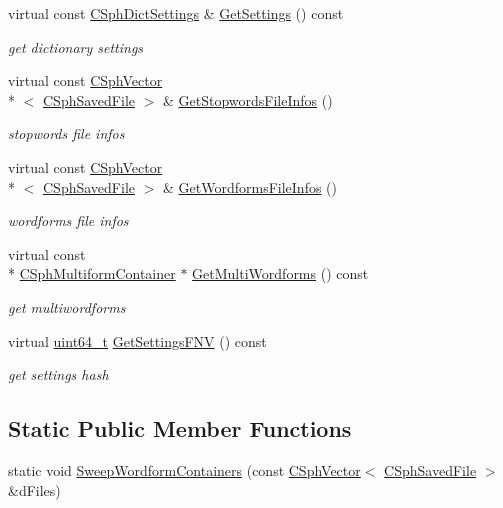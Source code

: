 \begin{DoxyCompactItemize}
virtual const \hyperlink{structCSphDictSettings}{C\-Sph\-Dict\-Settings} \& \hyperlink{structCSphTemplateDictTraits_ac40ff17a540d130a38299a1e4666162e}{Get\-Settings} () const 
\begin{DoxyCompactList}\small\item\em get dictionary settings \end{DoxyCompactList}\item 
virtual const \hyperlink{classCSphVector}{C\-Sph\-Vector}\\*
$<$ \hyperlink{structCSphSavedFile}{C\-Sph\-Saved\-File} $>$ \& \hyperlink{structCSphTemplateDictTraits_aaf753af354d7f4c9ad940bb8b279e78f}{Get\-Stopwords\-File\-Infos} ()
\begin{DoxyCompactList}\small\item\em stopwords file infos \end{DoxyCompactList}\item 
virtual const \hyperlink{classCSphVector}{C\-Sph\-Vector}\\*
$<$ \hyperlink{structCSphSavedFile}{C\-Sph\-Saved\-File} $>$ \& \hyperlink{structCSphTemplateDictTraits_a0ec8d48b25e69e974c74052ba9693c29}{Get\-Wordforms\-File\-Infos} ()
\begin{DoxyCompactList}\small\item\em wordforms file infos \end{DoxyCompactList}\item 
virtual const \\*
\hyperlink{structCSphMultiformContainer}{C\-Sph\-Multiform\-Container} $\ast$ \hyperlink{structCSphTemplateDictTraits_a3860234aa9a0bf582a287eb736dad6d7}{Get\-Multi\-Wordforms} () const 
\begin{DoxyCompactList}\small\item\em get multiwordforms \end{DoxyCompactList}\item 
virtual \hyperlink{sphinxstd_8h_aaa5d1cd013383c889537491c3cfd9aad}{uint64\-\_\-t} \hyperlink{structCSphTemplateDictTraits_ab60f925802d6bc198b4d80e6addf7415}{Get\-Settings\-F\-N\-V} () const 
\begin{DoxyCompactList}\small\item\em get settings hash \end{DoxyCompactList}\end{DoxyCompactItemize}
\subsection*{Static Public Member Functions}
\begin{DoxyCompactItemize}
\item 
static void \hyperlink{structCSphTemplateDictTraits_a8a966a1360df78e472bb4759c5878fbd}{Sweep\-Wordform\-Containers} (const \hyperlink{classCSphVector}{C\-Sph\-Vector}$<$ \hyperlink{structCSphSavedFile}{C\-Sph\-Saved\-File} $>$ \&d\-Files)
\end{DoxyCompactItemize}
